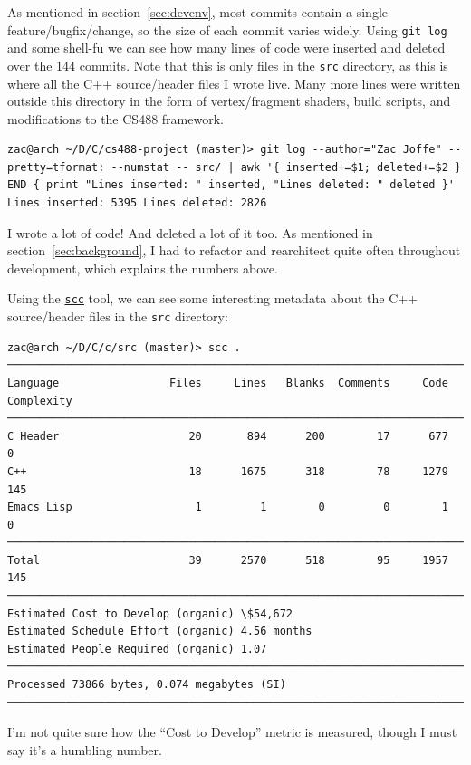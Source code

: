 \documentclass {article}
\begin{document}
As mentioned in section~\ref{sec:devenv}, most commits contain a single feature/bugfix/change, so the size of each commit varies widely. Using \texttt{git log} and some shell-fu we can see how many lines of code were inserted and deleted over the 144 commits. Note that this is only files in the \texttt{src} directory, as this is where all the C++ source/header files I wrote live. Many more lines were written outside this directory in the form of vertex/fragment shaders, build scripts, and modifications to the CS488 framework.
\begin{verbatim}
zac@arch ~/D/C/cs488-project (master)> git log --author="Zac Joffe" --pretty=tformat: --numstat -- src/ | awk '{ inserted+=$1; deleted+=$2 } END { print "Lines inserted: " inserted, "Lines deleted: " deleted }'
Lines inserted: 5395 Lines deleted: 2826
\end{verbatim}

I wrote a lot of code! And deleted a lot of it too. As mentioned in section~\ref{sec:background}, I had to refactor and rearchitect quite often throughout development, which explains the numbers above.

Using the \href{https://github.com/boyter/scc}\texttt{scc} tool, we can see some interesting metadata about the C++ source/header files in the \texttt{src} directory:
\begin{verbatim}
zac@arch ~/D/C/c/src (master)> scc .
───────────────────────────────────────────────────────────────────────────────
Language                 Files     Lines   Blanks  Comments     Code Complexity
───────────────────────────────────────────────────────────────────────────────
C Header                    20       894      200        17      677          0
C++                         18      1675      318        78     1279        145
Emacs Lisp                   1         1        0         0        1          0
───────────────────────────────────────────────────────────────────────────────
Total                       39      2570      518        95     1957        145
───────────────────────────────────────────────────────────────────────────────
Estimated Cost to Develop (organic) \$54,672
Estimated Schedule Effort (organic) 4.56 months
Estimated People Required (organic) 1.07
───────────────────────────────────────────────────────────────────────────────
Processed 73866 bytes, 0.074 megabytes (SI)
───────────────────────────────────────────────────────────────────────────────
\end{verbatim}
I'm not quite sure how the ``Cost to Develop'' metric is measured, though I must say it's a humbling number.
\end{document}
